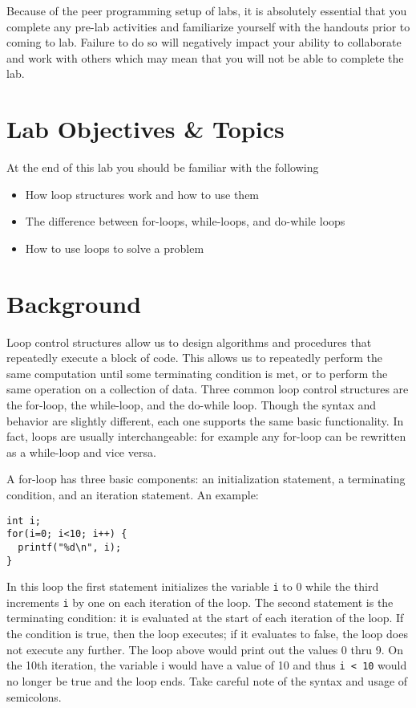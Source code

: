 \documentclass[12pt]{scrartcl}
\begin{document}
Because of the peer programming setup of labs, it is absolutely 
essential that you complete any pre-lab activities and familiarize
yourself with the handouts prior to coming to lab.  Failure to do
so will negatively impact your ability to collaborate and work with 
others which may mean that you will not be able to complete the
lab.  

\section{Lab Objectives \& Topics}
At the end of this lab you should be familiar with the following
\begin{itemize}
  \item How loop structures work and how to use them
  \item The difference between for-loops, while-loops, and do-while loops
  \item How to use loops to solve a problem
\end{itemize}

\section{Background}

Loop control structures allow us to design algorithms and procedures 
that repeatedly execute a block of code.  This allows us to repeatedly 
perform the same computation until some terminating condition is met, 
or to perform the same operation on a collection of data.  Three 
common loop control structures are the for-loop, the while-loop, and 
the do-while loop.  Though the syntax and behavior are slightly different, 
each one supports the same basic functionality.  In fact, loops are 
usually interchangeable: for example any for-loop can be rewritten 
as a while-loop and vice versa.

A for-loop has three basic components: an initialization statement, 
a terminating condition, and an iteration statement.  An example:

\begin{verbatim}
int i;
for(i=0; i<10; i++) {
  printf("%d\n", i); 
}
\end{verbatim}

In this loop the first statement initializes the variable \texttt{i} 
to 0 while the third increments \texttt{i} by one on each 
iteration of the loop.  The second statement is the terminating 
condition: it is evaluated at the start of each iteration of the loop.  
If the condition is true, then the loop executes; if it evaluates to 
false, the loop does not execute any further.  The loop above 
would print out the values 0 thru 9.  On the 10th iteration, the 
variable i would have a value of 10 and thus \texttt{i < 10} 
would no longer be true and the loop ends.  Take careful note of the 
syntax and usage of semicolons.
\end{document}
